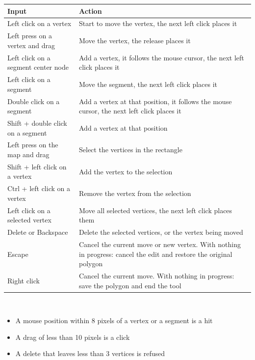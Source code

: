 \begin{center}
 \begin{tabularx}{\textwidth}{ | l | X |}
  \hline
  \textbf{Input} & \textbf{Action} \\
  \hline
  \hline
  Left click on a vertex & Start to move the vertex, the next left click places it \\
  \hline
  Left press on a vertex and drag & Move the vertex, the release places it \\
  \hline
  Left click on a segment center node & Add a vertex, it follows the mouse cursor, the next left click places it \\
  \hline
  Left click on a segment & Move the segment, the next left click places it \\
  \hline
  Double click on a segment & Add a vertex at that position, it follows the mouse cursor, the next left click places it \\
  \hline
  Shift + double click on a segment & Add a vertex at that position \\
  \hline
  Left press on the map and drag & Select the vertices in the rectangle \\
  \hline
  Shift + left click on a vertex & Add the vertex to the selection \\
  \hline
  Ctrl + left click on a vertex & Remove the vertex from the selection \\
  \hline
  Left click on a selected vertex & Move all selected vertices, the next left click places them \\
  \hline
  Delete or Backspace & Delete the selected vertices, or the vertex being moved \\
  \hline
  Escape & Cancel the current move or new vertex. With nothing in progress: cancel the edit and restore the original polygon \\
  \hline
  Right click & Cancel the current move. With nothing in progress: save the polygon and end the tool \\
  \hline
 \end{tabularx}
\end{center}
\ \\

\begin{itemize}
 \item A mouse position within 8 pixels of a vertex or a segment is a hit
 \item A drag of less than 10 pixels is a click
 \item A delete that leaves less than 3 vertices is refused
\end{itemize}
